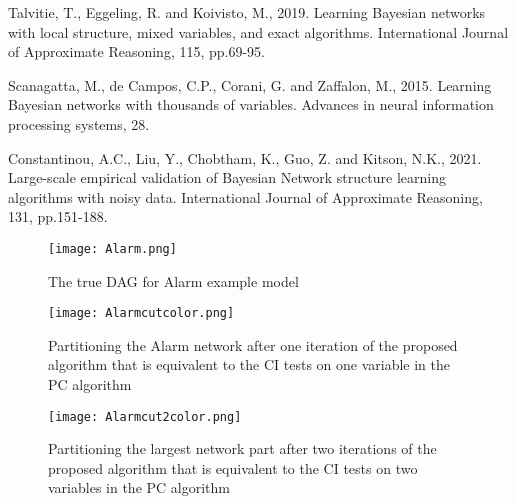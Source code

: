 \documentclass{article}
\begin{document}
\begin{thebibliography}{1}
{
Talvitie, T., Eggeling, R. and Koivisto, M., 2019. Learning Bayesian networks with local structure, mixed variables, and exact algorithms. International Journal of Approximate Reasoning, 115, pp.69-95.

Scanagatta, M., de Campos, C.P., Corani, G. and Zaffalon, M., 2015. Learning Bayesian networks with thousands of variables. Advances in neural information processing systems, 28.

Constantinou, A.C., Liu, Y., Chobtham, K., Guo, Z. and Kitson, N.K., 2021. Large-scale empirical validation of Bayesian Network structure learning algorithms with noisy data. International Journal of Approximate Reasoning, 131, pp.151-188.




}

\end{thebibliography}

\begin{figure}
    \centering
    \texttt{[image: Alarm.png]}
    \caption{\cite{2021alarm} The true DAG for Alarm example model}
    \label{Alarm}
\end{figure}

\begin{figure}
    \centering
    \texttt{[image: Alarmcutcolor.png]}
    \caption{Partitioning the Alarm network after one iteration of the proposed algorithm that is equivalent to the CI tests on one variable in the PC algorithm}
    \label{Alarm1}
\end{figure}

\begin{figure}
    \centering
    \texttt{[image: Alarmcut2color.png]}
    \caption{Partitioning the largest network part after two iterations of the proposed algorithm that is equivalent to the CI tests on two variables in the PC algorithm}
    \label{Alarm2}
\end{figure}
\end{document}
